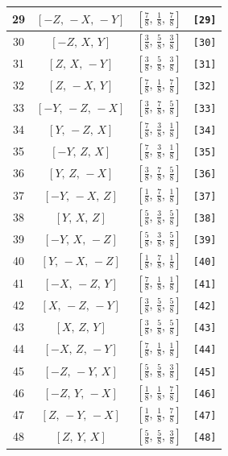 \documentclass[fleqn,8pt]{jsarticle}
\begin{document}
\begin{longtable}{cccc}
29 & $\left[ - Z,\, - X,\, - Y \right]$ & $\left[ \frac{7}{8},\, \frac{1}{8},\, \frac{7}{8} \right]$ & {\tt [29]} \\ \hline
30 & $\left[ - Z,\, X,\, Y \right]$ & $\left[ \frac{3}{8},\, \frac{5}{8},\, \frac{3}{8} \right]$ & {\tt [30]} \\ \hline
31 & $\left[ Z,\, X,\, - Y \right]$ & $\left[ \frac{3}{8},\, \frac{5}{8},\, \frac{3}{8} \right]$ & {\tt [31]} \\ \hline
32 & $\left[ Z,\, - X,\, Y \right]$ & $\left[ \frac{7}{8},\, \frac{1}{8},\, \frac{7}{8} \right]$ & {\tt [32]} \\ \hline
33 & $\left[ - Y,\, - Z,\, - X \right]$ & $\left[ \frac{3}{8},\, \frac{7}{8},\, \frac{5}{8} \right]$ & {\tt [33]} \\ \hline
34 & $\left[ Y,\, - Z,\, X \right]$ & $\left[ \frac{7}{8},\, \frac{3}{8},\, \frac{1}{8} \right]$ & {\tt [34]} \\ \hline
35 & $\left[ - Y,\, Z,\, X \right]$ & $\left[ \frac{7}{8},\, \frac{3}{8},\, \frac{1}{8} \right]$ & {\tt [35]} \\ \hline
36 & $\left[ Y,\, Z,\, - X \right]$ & $\left[ \frac{3}{8},\, \frac{7}{8},\, \frac{5}{8} \right]$ & {\tt [36]} \\ \hline
37 & $\left[ - Y,\, - X,\, Z \right]$ & $\left[ \frac{1}{8},\, \frac{7}{8},\, \frac{1}{8} \right]$ & {\tt [37]} \\ \hline
38 & $\left[ Y,\, X,\, Z \right]$ & $\left[ \frac{5}{8},\, \frac{3}{8},\, \frac{5}{8} \right]$ & {\tt [38]} \\ \hline
39 & $\left[ - Y,\, X,\, - Z \right]$ & $\left[ \frac{5}{8},\, \frac{3}{8},\, \frac{5}{8} \right]$ & {\tt [39]} \\ \hline
40 & $\left[ Y,\, - X,\, - Z \right]$ & $\left[ \frac{1}{8},\, \frac{7}{8},\, \frac{1}{8} \right]$ & {\tt [40]} \\ \hline
41 & $\left[ - X,\, - Z,\, Y \right]$ & $\left[ \frac{7}{8},\, \frac{1}{8},\, \frac{1}{8} \right]$ & {\tt [41]} \\ \hline
42 & $\left[ X,\, - Z,\, - Y \right]$ & $\left[ \frac{3}{8},\, \frac{5}{8},\, \frac{5}{8} \right]$ & {\tt [42]} \\ \hline
43 & $\left[ X,\, Z,\, Y \right]$ & $\left[ \frac{3}{8},\, \frac{5}{8},\, \frac{5}{8} \right]$ & {\tt [43]} \\ \hline
44 & $\left[ - X,\, Z,\, - Y \right]$ & $\left[ \frac{7}{8},\, \frac{1}{8},\, \frac{1}{8} \right]$ & {\tt [44]} \\ \hline
45 & $\left[ - Z,\, - Y,\, X \right]$ & $\left[ \frac{5}{8},\, \frac{5}{8},\, \frac{3}{8} \right]$ & {\tt [45]} \\ \hline
46 & $\left[ - Z,\, Y,\, - X \right]$ & $\left[ \frac{1}{8},\, \frac{1}{8},\, \frac{7}{8} \right]$ & {\tt [46]} \\ \hline
47 & $\left[ Z,\, - Y,\, - X \right]$ & $\left[ \frac{1}{8},\, \frac{1}{8},\, \frac{7}{8} \right]$ & {\tt [47]} \\ \hline
48 & $\left[ Z,\, Y,\, X \right]$ & $\left[ \frac{5}{8},\, \frac{5}{8},\, \frac{3}{8} \right]$ & {\tt [48]} \\
\end{longtable}
\end{document}

